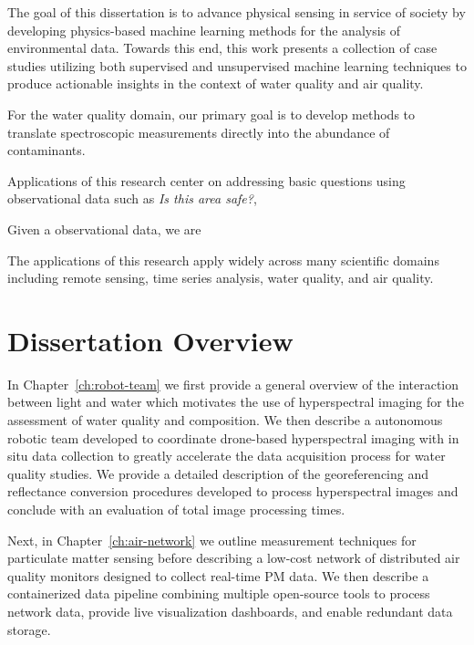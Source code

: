 The goal of this dissertation is to advance physical sensing in service of
society by developing physics-based machine learning methods for the analysis
of environmental data. Towards this end, this work presents a collection of case
studies utilizing both supervised and unsupervised machine learning techniques
to produce actionable insights in the context of water quality and air quality.

For the water quality domain, our primary goal is to develop methods to translate
spectroscopic measurements directly into the abundance of contaminants. 


Applications of this research center on addressing basic questions using
observational data such as \textit{Is this area safe?}, 


Given a observational data, we are 

The applications of this research apply widely across many scientific domains
including remote sensing, time series analysis, water quality, and air quality.






\section{Dissertation Overview}

In Chapter~\ref{ch:robot-team} we first provide a general overview of the
interaction between light and water which motivates the use of hyperspectral imaging
for the assessment of water quality and composition. We then describe a
autonomous robotic team developed to coordinate drone-based hyperspectral imaging
with in situ data collection to greatly accelerate the data acquisition process
for water quality studies. We provide a detailed description of the
georeferencing and reflectance conversion procedures developed to process
hyperspectral images and conclude with an evaluation of total image processing times.

Next, in Chapter~\ref{ch:air-network} we outline measurement techniques for
particulate matter sensing before describing a low-cost network of distributed
air quality monitors designed to collect real-time PM data. We then describe a
containerized data pipeline combining multiple open-source tools to process
network data, provide live visualization dashboards, and enable redundant
data storage.

